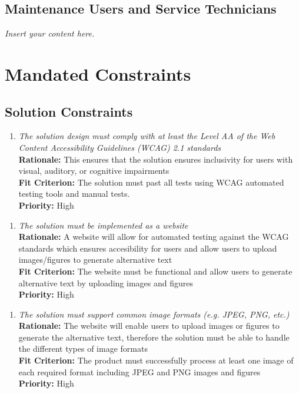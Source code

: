 \documentclass[12pt]{article}
\newcommand{\lips}{\textit{Insert your content here.}}
\begin{document}
\subsection{Maintenance Users and Service Technicians}
\lips

\section{Mandated Constraints}
\subsection{Solution Constraints}
\begin{enumerate}[label=MD-SL \arabic*., wide=0pt, leftmargin=*]
  \item \emph{The solution design must comply with at least the Level AA of the Web Content Accessibility Guidelines (WCAG) 2.1 standards}\\[2mm]
    {\bf Rationale:} This ensures that the solution ensures inclusivity for users with visual, auditory, or cognitive impairments\\
    {\bf Fit Criterion:} The solution must past all tests using WCAG automated testing tools and manual tests.\\
    {\bf Priority:} High
\end{enumerate}
\begin{enumerate}[label=MD-SL \arabic*., wide=0pt, leftmargin=*]
  \item \emph{The solution must be implemented as a website}\\[2mm]
    {\bf Rationale:} A website will allow for automated testing against the WCAG standards which ensures accesibility for users 
    and allow users to upload images/figures to generate alternative text\\
    {\bf Fit Criterion:} The website must be functional and allow users to generate alternative text by uploading
    images and figures\\
    {\bf Priority:} High
\end{enumerate}
\begin{enumerate}[label=MD-SL \arabic*., wide=0pt, leftmargin=*]
  \item \emph{The solution must support common image formats (e.g. JPEG, PNG, etc.)}\\[2mm]
    {\bf Rationale:} The website will enable users to upload images or figures to generate the alternative text, therefore the solution must be able 
    to handle the different types of image formats\\
    {\bf Fit Criterion:} The product must successfully process at least one image of each required format including JPEG and PNG
    images and figures\\
    {\bf Priority:} High
\end{enumerate}
\end{document}
